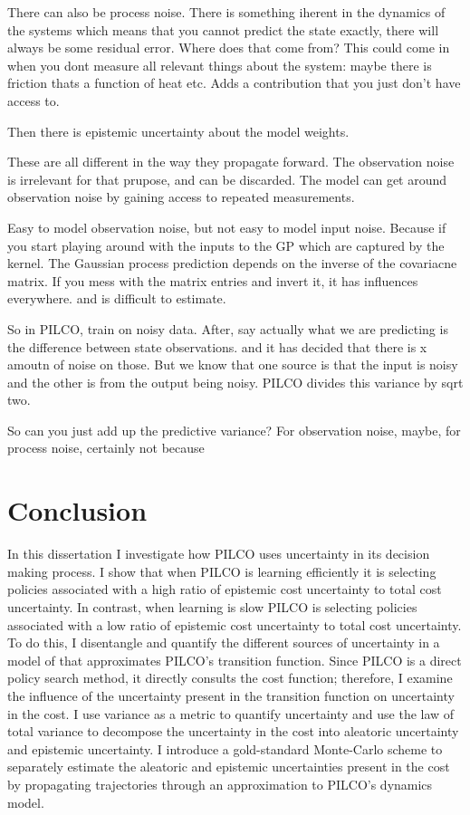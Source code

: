 There can also be process noise. There is something iherent in the dynamics of the systems which means that you cannot predict the state exactly, there will always be some residual error. Where does that come from? This could come in when you dont measure all relevant things about the system: maybe there is friction thats a function of heat etc. Adds a contribution that you just don't have access to.

Then there is epistemic  uncertainty about the model weights.

These are all different in the way they propagate forward. The observation noise is irrelevant for that prupose, and can be discarded. The model can get around observation noise by gaining access to repeated measurements. 

Easy to model observation noise, but not easy to model input noise. Because if you start playing around with the inputs to the GP which are captured by the kernel. The Gaussian process prediction depends on the inverse of the covariacne matrix. If you mess with the matrix entries and invert it, it has influences everywhere. and is difficult to estimate.

So in PILCO, train on noisy data. After, say actually what we are predicting is the difference between state observations. and it has decided that there is x amoutn of noise on those. But we know that one source is that the input is noisy and the other is from the output being noisy. PILCO divides this variance by sqrt two. 

So can you just add up the predictive variance? For observation noise, maybe, for process noise, certainly not because 


\section{Conclusion}
\label{S:conclusions}
In this dissertation I investigate how PILCO uses uncertainty in its decision making process. I show that when PILCO is learning efficiently it is selecting policies associated with a high ratio of epistemic cost uncertainty to total cost uncertainty. In contrast, when learning is slow PILCO is selecting policies associated with a low ratio of epistemic cost uncertainty to total cost uncertainty. 
To do this, I disentangle and quantify the different sources of uncertainty in a model of that approximates PILCO's transition function. Since PILCO is a direct policy search method, it directly consults the cost function; therefore, I examine the influence of the uncertainty present in the transition function on uncertainty in the cost. I use variance as a metric to quantify uncertainty and use the law of total variance to decompose the uncertainty in the cost into aleatoric uncertainty and epistemic uncertainty. I introduce a gold-standard Monte-Carlo scheme to separately estimate the aleatoric and epistemic uncertainties present in the cost by propagating trajectories through an approximation to PILCO's dynamics model. 

